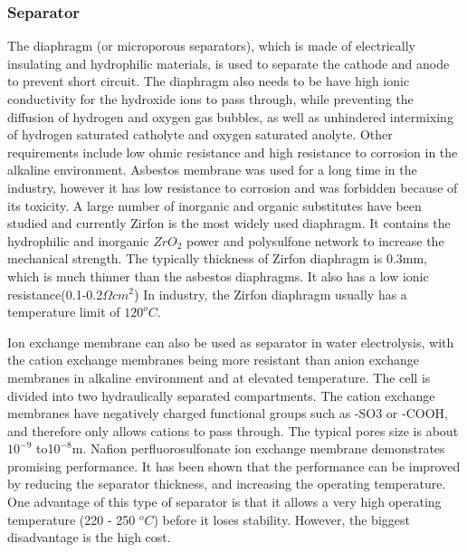 \subsubsection{Separator} 
The diaphragm (or microporous separators), which is made of electrically insulating and hydrophilic materials, is used to separate the cathode and anode to prevent short circuit. The diaphragm also needs to be have high ionic conductivity for the hydroxide ions to pass through, while preventing the diffusion of hydrogen and oxygen gas bubbles, as well as unhindered intermixing of hydrogen saturated catholyte and oxygen saturated anolyte. Other requirements include low ohmic resistance and high resistance to corrosion in the alkaline environment. Asbestos membrane was used for a long time in the industry, however it has low resistance to corrosion and was forbidden because of its toxicity. A large number of inorganic and organic substitutes have been studied and currently Zirfon is the most widely used diaphragm. It contains the hydrophilic and inorganic $ZrO_2$ power and polysulfone network to increase the mechanical strength. The typically thickness of Zirfon diaphragm is 0.3mm, which is much thinner than the asbestos diaphragms. It also has a low ionic resistance(0.1-0.2$\Omega cm^2$)\cite{zirfon} In industry, the Zirfon diaphragm usually has a temperature limit of $120^oC$.\cite{pressure}


Ion exchange membrane can also be used as separator in water electrolysis, with the cation exchange membranes being more resistant than anion exchange membranes in alkaline environment and at elevated temperature. The cell is divided into two hydraulically separated compartments. The cation exchange membranes have negatively charged functional groups such as -SO3 or -COOH, and therefore only allows cations to pass through. \cite{ionexchange} The typical pores size is about $10^{-9}$ to1$ 0^{-8}$m.\cite{separator} Nafion perfluorosulfonate ion exchange membrane demonstrates promising performance. It has been shown that the performance can be improved by reducing the separator thickness, and increasing the operating temperature. One advantage of this type of separator is that it allows a very high operating temperature (220 - 250 $^oC$) before it loses stability.\cite{separator3} However, the biggest disadvantage is the high cost.\cite{separator2} 

